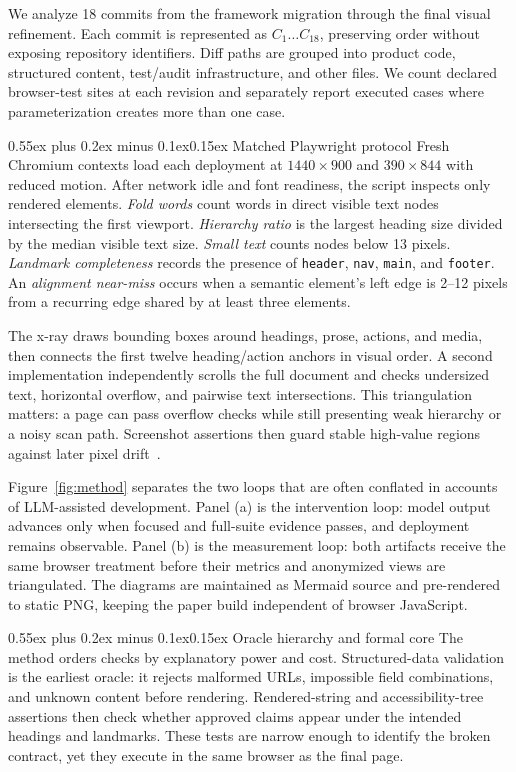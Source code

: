 \documentclass[9pt,twocolumn]{extarticle}
\makeatletter
\renewcommand{\subsection}{\@startsection{subsection}{2}{0pt}%
  {0.55ex plus 0.2ex minus 0.1ex}{0.15ex}%
  {\normalfont\normalsize\bfseries}}
\makeatother
\begin{document}
We analyze 18 commits from the framework migration through the final visual refinement. Each commit is represented as $C_1\ldots C_{18}$, preserving order without exposing repository identifiers. Diff paths are grouped into product code, structured content, test/audit infrastructure, and other files. We count declared browser-test sites at each revision and separately report executed cases where parameterization creates more than one case.

\subsection{Matched Playwright protocol}
Fresh Chromium contexts load each deployment at $1440\!\times\!900$ and $390\!\times\!844$ with reduced motion. After network idle and font readiness, the script inspects only rendered elements. \emph{Fold words} count words in direct visible text nodes intersecting the first viewport. \emph{Hierarchy ratio} is the largest heading size divided by the median visible text size. \emph{Small text} counts nodes below 13 pixels. \emph{Landmark completeness} records the presence of \texttt{header}, \texttt{nav}, \texttt{main}, and \texttt{footer}. An \emph{alignment near-miss} occurs when a semantic element's left edge is 2--12 pixels from a recurring edge shared by at least three elements.

The x-ray draws bounding boxes around headings, prose, actions, and media, then connects the first twelve heading/action anchors in visual order. A second implementation independently scrolls the full document and checks undersized text, horizontal overflow, and pairwise text intersections. This triangulation matters: a page can pass overflow checks while still presenting weak hierarchy or a noisy scan path. Screenshot assertions then guard stable high-value regions against later pixel drift~\cite{playwright,alegroth2017}.

Figure~\ref{fig:method} separates the two loops that are often conflated in accounts of LLM-assisted development. Panel (a) is the intervention loop: model output advances only when focused and full-suite evidence passes, and deployment remains observable. Panel (b) is the measurement loop: both artifacts receive the same browser treatment before their metrics and anonymized views are triangulated. The diagrams are maintained as Mermaid source and pre-rendered to static PNG, keeping the paper build independent of browser JavaScript.

\subsection{Oracle hierarchy and formal core}
The method orders checks by explanatory power and cost. Structured-data validation is the earliest oracle: it rejects malformed URLs, impossible field combinations, and unknown content before rendering. Rendered-string and accessibility-tree assertions then check whether approved claims appear under the intended headings and landmarks. These tests are narrow enough to identify the broken contract, yet they execute in the same browser as the final page.
\end{document}

